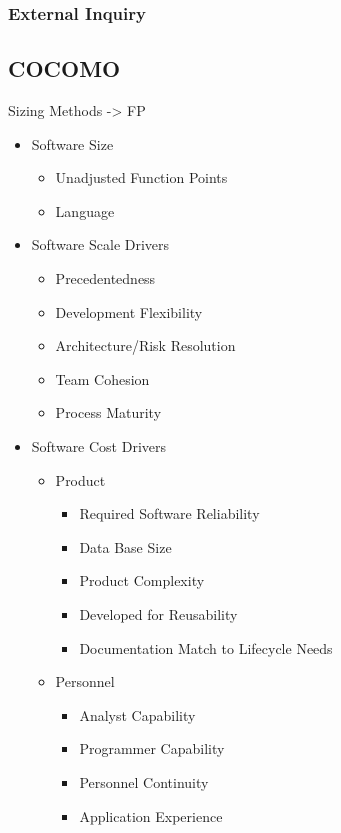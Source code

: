 \subsubsection{External Inquiry}
\begin{itemize}
\end{itemize}
\subsection{COCOMO}
Sizing Methods -> FP
\begin{itemize}
	\item Software Size
	\begin{itemize}
		\item Unadjusted Function Points
		\item Language
	\end{itemize}
	\item Software Scale Drivers
	\begin{itemize}
		\item Precedentedness
		\item Development Flexibility
		\item Architecture/Risk Resolution
		\item Team Cohesion
		\item Process Maturity
	\end{itemize}
	\item Software Cost Drivers
	\begin{itemize}
		\item Product
		\begin{itemize}
			\item Required Software Reliability
			\item Data Base Size
			\item Product Complexity
			\item Developed for Reusability
			\item Documentation Match to Lifecycle Needs
		\end{itemize}
		\item Personnel
		\begin{itemize}
			\item Analyst Capability
			\item Programmer Capability
			\item Personnel Continuity
			\item Application Experience

\end{itemize}
\end{itemize}
\end{itemize}
